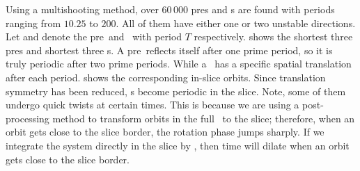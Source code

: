 Using a multishooting method, over $60\,000$ pre\po s and \rpo s are found with
periods ranging from $10.25$ to $200$. All of them have either one or two
unstable directions. Let  and  denote the pre\po\ and \rpo\ with
period $T$ respectively.  shows the shortest three pre\po s and
shortest three \rpo s. A pre\po\ reflects itself after one prime period, so it is
truly periodic after two prime periods. While a \rpo\ has a specific
spatial translation after each period.  shows the
corresponding in-slice orbits. Since translation symmetry has been reduced,
\rpo s become periodic in the slice. Note, some of them undergo quick twists
at certain times. This is because we are using a post-processing method to transform
orbits in the full \statesp\ to the slice; therefore, when an orbit
gets close to the slice border, the rotation phase jumps sharply. If we integrate
the system directly in the slice by , then time will dilate when
an orbit gets close to the slice border.

